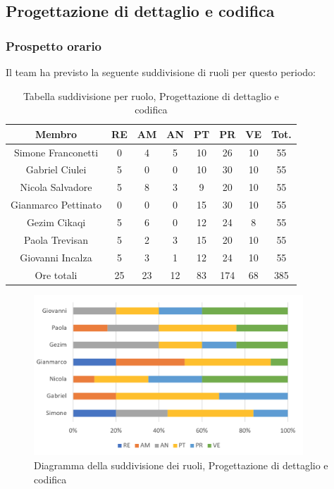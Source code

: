\subsection{Progettazione di dettaglio e codifica}
\subsubsection{Prospetto orario}
Il team ha previsto la seguente suddivisione di ruoli per questo periodo:
\FloatBarrier
\begin{table}[h]
\caption{Tabella suddivisione per ruolo, Progettazione di dettaglio e codifica}
\begin{center}
\begin{tabular}{ |c|c|c|c|c|c|c|c|  }
 \hline
 Membro 		& RE 	& AM 	& AN 	& PT 	& PR 	& VE 	& Tot.\\
 \hline\hline
 Simone	Franconetti		& 0 		& 4		& 5 	& 10 	& 26 		& 10 		& 55\\
 Gabriel Ciulei		& 5 		& 0 		& 0 	& 10		& 30 		& 10 		& 55\\
 Nicola	Salvadore		& 5 		& 8 		& 3 	& 9 		& 20 		& 10 		& 55\\
 Gianmarco	Pettinato	& 0 		& 0 		& 0 	& 15 	& 30 		& 10 		& 55\\
 Gezim	Cikaqi		& 5 		& 6 		& 0 	& 12 	& 24 		& 8	 		& 55\\
 Paola	Trevisan		& 5 		& 2 		& 3 	& 15 	& 20 		& 10 		& 55\\
 Giovanni	Incalza	& 5 		& 3	 	& 1 	& 12 	& 24 		& 10  		& 55\\
 \hline\hline
 Ore totali		& 25		& 23		& 12 	& 83	 	& 174 	& 68 	& 385\\
  \hline
\end{tabular}
\end{center}
\end{table}
\FloatBarrier
\FloatBarrier
\begin{figure}[h!]
	\centering
	\includegraphics[width=0.9\textwidth]{res/img/hi33}
	\caption{Diagramma della suddivisione dei ruoli, Progettazione di dettaglio e codifica}
\end{figure}
